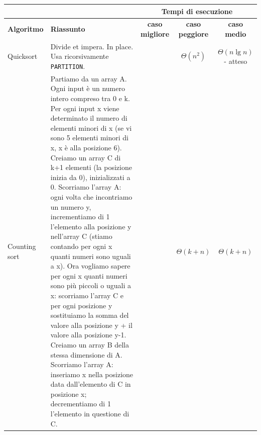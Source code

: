 \documentclass[11pt,a4paper]{article}
\begin{document}
\begin{sideways}
  \begin{tabularx}{550pt}{l|X|c|c|c}
    \multicolumn{2}{c}{\ } & \multicolumn{3}{c}{\textbf{Tempi di esecuzione}}\\
    \hline
    \textbf{Algoritmo} & \textbf{Riassunto} & \textbf{caso migliore} & \textbf{caso peggiore} & \textbf{caso medio}\\
    \hline
    Quicksort &
    Divide et impera. In place. Usa ricorsivamente
    \texttt{PARTITION}. & &
    $\Theta(n^2)$ &
    $\Theta(n \lg n)$ - atteso \\
    \hline
    Counting sort &
    Partiamo da un array A. Ogni input è un
    numero intero compreso tra 0 e k. Per ogni
    input x viene determinato il numero di
    elementi minori di x (se vi sono 5 elementi
    minori di x, x è alla posizione 6).
    Creiamo un array C di k+1 elementi (la
    posizione inizia da 0), inizializzati a 0.
    Scorriamo l’array A: ogni volta che
    incontriamo un numero y, incrementiamo di
    1 l’elemento alla posizione y nell’array C
    (stiamo contando per ogni x quanti numeri
    sono uguali a x).
    Ora vogliamo sapere per ogni x quanti numeri
    sono più piccoli o uguali a x: scorriamo l’array
    C e per ogni posizione y sostituiamo la
    somma del valore alla posizione y + il valore
    alla posizione y-1.
    Creiamo un array B della stessa dimensione di
    A. Scorriamo l’array A: inseriamo x nella
    posizione data dall’elemento di C in posizione
    x; decrementiamo di 1 l’elemento in
    questione di C. & &
    $\Theta(k+n)$ &
    $\Theta(k+n)$
  \end{tabularx}
\end{sideways}
\end{document}
